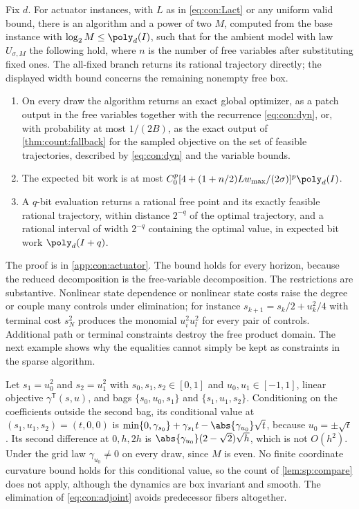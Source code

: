 \begin{theorem}\label{thm:con:actuator}
Fix $d$. For actuator instances, with $L$ as in \eqref{eq:con:Lact} or any
uniform valid bound, there is an algorithm and a power of two $M$, computed
from the base instance with $\log_2M\le\poly_d(I)$, such that for the ambient
model with law $U_{\sigma,M}$ the following hold, where $n$ is the number of
free variables after substituting fixed ones. The all-fixed branch
returns its rational trajectory directly; the displayed width bound
concerns the remaining nonempty free box.
\begin{enumerate}[label=(\roman*)]
\item On every draw the algorithm returns an exact global optimizer, as a
patch output in the free variables together with the recurrence
\eqref{eq:con:dyn}, or, with probability at most $1/(2B)$, as the exact
output of \cref{thm:count:fallback} for the sampled objective on the set of
feasible trajectories, described by \eqref{eq:con:dyn} and the variable
bounds.
\item The expected bit work is at most
$C_0^p[4+(1+n/2)Lw_{\max}/(2\sigma)]^p\poly_d(I)$.
\item A $q$-bit evaluation returns a rational free point and its exactly
feasible rational trajectory, within distance $2^{-q}$ of the optimal
trajectory, and a rational interval of width $2^{-q}$ containing the optimal
value, in expected bit work $\poly_d(I+q)$.
\end{enumerate}
\end{theorem}

The proof is in \cref{app:con:actuator}. The bound holds for every horizon,
because the reduced decomposition is the free-variable decomposition. The
restrictions are substantive. Nonlinear state dependence or nonlinear state
costs raise the degree or couple many controls under elimination; for
instance $s_{k+1}=s_k/2+u_k^2/4$ with terminal cost $s_N^2$ produces the
monomial $u_i^2u_l^2$ for every pair of controls. Additional path or terminal
constraints destroy the free product domain. The next example shows why the
equalities cannot simply be kept as constraints in the sparse algorithm.

\begin{example}\label{ex:con:dyn}
Let $s_1=u_0^2$ and $s_2=u_1^2$ with $s_0,s_1,s_2\in[0,1]$ and
$u_0,u_1\in[-1,1]$, linear objective $\gamma^{\mathsf T}(s,u)$, and bags
$\{s_0,u_0,s_1\}$ and $\{s_1,u_1,s_2\}$. Conditioning on the coefficients
outside the second bag, its conditional value at $(s_1,u_1,s_2)=(t,0,0)$ is
$\min\{0,\gamma_{s_0}\}+\gamma_{s_1}t-\abs{\gamma_{u_0}}\sqrt t$, because
$u_0=\pm\sqrt t$. Its second difference at $0,h,2h$ is
$\abs{\gamma_{u_0}}(2-\sqrt2)\sqrt h$, which is not $O(h^2)$. Under the grid
law $\gamma_{u_0}\ne0$ on every draw, since $M$ is even. No finite
coordinate curvature bound holds for this conditional value, so the count of
\cref{lem:sp:compare} does not apply, although the dynamics are box invariant
and smooth. The elimination of \eqref{eq:con:adjoint} avoids predecessor
fibers altogether.
\end{example}


